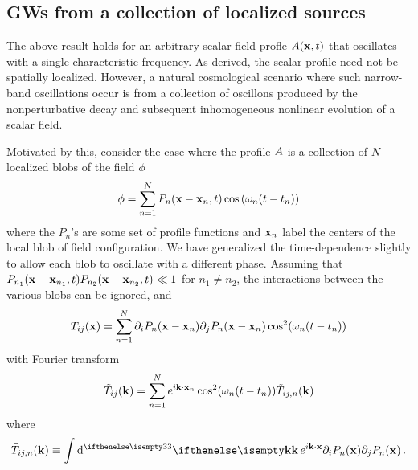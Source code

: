 \documentclass{revtex4}
\begin{document}


\subsection{GWs from a collection of localized sources}
The above result holds for an arbitrary scalar field profle $A({\bf x},t)$ that oscillates with a single characteristic frequency.
As derived, the scalar profile need not be spatially localized.
However, a natural cosmological scenario where such narrow-band oscillations occur is from a collection of oscillons produced by the nonperturbative decay and subsequent inhomogeneous nonlinear evolution of a scalar field.

Motivated by this, consider the case where the profile $A$ is a collection of $N$ localized blobs of the field $\phi$
\begin{equation}
  \phi = \sum_{n=1}^{N} P_n({\bf x-x}_n,t)\cos\left(\omega_n(t-t_n)\right)
\end{equation}
where the $P_n$'s are some set of profile functions and ${\bf x}_n$ label the centers of the local blob of field configuration.
We have generalized the time-dependence slightly to allow each blob to oscillate with a different phase.
Assuming that $P_{n_1}({\bf x-x}_{n_1},t)P_{n_{2}}({\bf x - x}_{n_2},t) \ll 1$ for $n_1 \neq n_2$, the interactions between the various blobs can be ignored, and
\begin{equation}
  T_{ij}({\bf x}) = \sum_{n=1}^N\partial_iP_n({\bf x-x}_n)\partial_jP_n({\bf x-x}_n)\cos^2(\omega_n(t-t_n))
\end{equation}
with Fourier transform
\begin{equation}
  \tilde{T}_{ij}({\bf k}) = \sum_{n=1}^Ne^{i{\bf k}\cdot{\bf x}_n}\cos^2(\omega_n(t-t_n))\tilde{T}_{ij,n}({\bf k})
\end{equation}
where
\begin{equation}
  \tilde{T}_{ij,n}(\kvec) \equiv \int \ud[3]{\kvec}e^{i\kvec\cdot\xvec}\partial_iP_n(\xvec)\partial_jP_n(\xvec) \, .
\end{equation}
\end{document}

